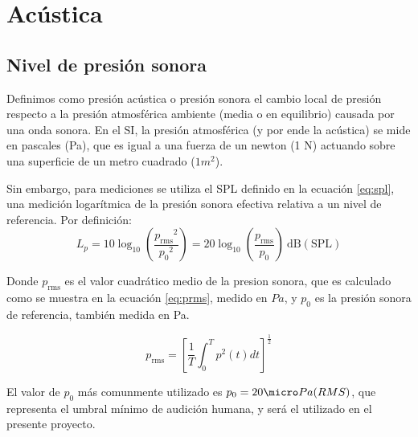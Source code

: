 
%	

\section{Acústica}
\label{sec:RuidoAmb}

\subsection{Nivel de presión sonora}

Definimos como presión acústica o presión sonora el cambio local de presión respecto a la presión atmosférica ambiente (media o en equilibrio) causada por una onda sonora. En el SI, la presión atmosférica (y por ende la acústica) se mide en pascales (Pa), que es igual a una fuerza de un newton (1 N) actuando sobre una superficie de un metro cuadrado ($1 m^2$).

Sin embargo, para mediciones se utiliza el \ac{SPL} definido en la ecuación \ref{eq:spl}, una medición logarítmica de la presión sonora efectiva relativa a un nivel de referencia. Por definición:
\begin{equation}
L_p = 10 \log_{10}\left(\frac{{p_\mathrm{rms}}^2}{{p_0}^2}\right) = 20 \log_{10}\left(\frac{p_\mathrm{rms}}{p_0}\right)~\mathrm{dB (SPL)}
\label{eq:spl}
\end{equation}

Donde $p_\mathrm{rms}$ es el valor cuadrático medio de la presion sonora, que es calculado como se muestra en la ecuación \ref{eq:prms}, medido en $Pa$, y $p_0$ es la presión sonora de referencia, también medida en Pa.

\begin{equation}
p_\mathrm{rms} = \left[ \frac{1}{T} \int_0^T p^2(t)dt \right]^\frac{1}{2}
\label{eq:prms}
\end{equation}

El valor de $p_0$ más comunmente utilizado es $p_0 = 20 \micro Pa (RMS)$, que representa el umbral mínimo de audición humana, y será el utilizado en el presente proyecto.

